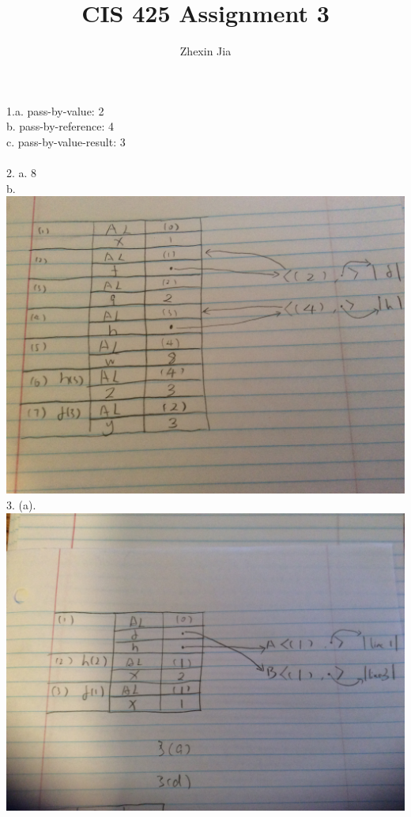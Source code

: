 \documentclass[12pt]{article}
\begin{document}
\title{CIS 425 Assignment 3}
\author{Zhexin Jia}
\maketitle

\noindent 1.a. pass-by-value: 2\\
b. pass-by-reference: 4\\
c. pass-by-value-result: 3\\
\vspace{1mm}\\
2. a. 8\\
b. \\
\includegraphics[width=\textwidth]{2b.jpg}
\vspace{1mm}\\
3. (a).\\
\includegraphics[width=\textwidth]{3a.jpg}
\end{document}
